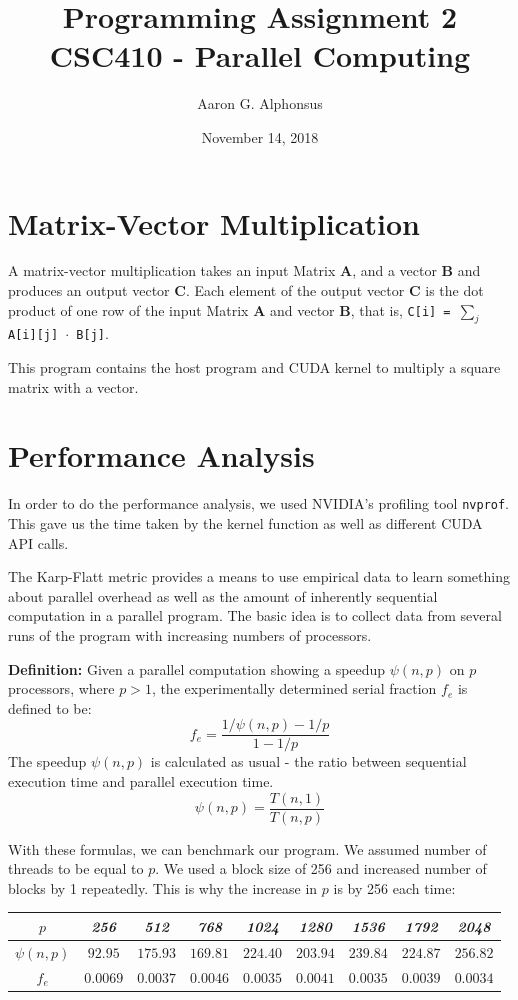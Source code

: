\documentclass{article}
\title{Programming Assignment 2\\ CSC410 - Parallel Computing}
\author{Aaron G. Alphonsus}
\date{November 14, 2018}
\begin{document}
\maketitle

\section{Matrix-Vector Multiplication}

A matrix-vector multiplication takes an input Matrix \textbf{A}, and a vector 
\textbf{B} and produces an output vector \textbf{C}. Each element of the output 
vector \textbf{C} is the dot product of one row of the input Matrix \textbf{A} 
and vector \textbf{B}, that is, \texttt{C[i] = $\sum_{j}$ A[i][j] $\cdot$ B[j]}.

\medskip
\noindent
This program contains the host program and CUDA kernel to multiply a square 
matrix with a vector.

\section{Performance Analysis}
In order to do the performance analysis, we used NVIDIA's profiling tool 
\texttt{nvprof}. This gave us the time taken by the kernel function as well as 
different CUDA API calls.

\medskip
\noindent
The Karp-Flatt metric provides a means to use empirical data to learn something 
about parallel overhead as well as the amount of inherently sequential 
computation in a parallel program. The basic idea is to collect data from 
several runs of the program with increasing numbers of processors.

\medskip
\noindent
\textbf{Definition:} Given a parallel computation showing a speedup $\psi(n, p)$
on $p$ processors, where $p > 1$, the experimentally determined serial fraction 
$f_e$ is defined to be: 
\[f_e = \frac{1/\psi(n, p) - 1/p}{1 - 1/p}\]
The speedup $\psi(n, p)$ is calculated as usual - the ratio between sequential 
execution time and parallel execution time.
\[\psi(n, p) = \frac{T(n, 1)}{T(n, p)}\]

\medskip
\noindent
With these formulas, we can benchmark our program. We assumed number of threads 
to be equal to $p$. We used a block size of 256 and increased number of blocks 
by 1 repeatedly. This is why the increase in $p$ is by 256 each time:
\begin{table}[ht]
\centering
\begin{tabular}{|c|c|c|c|c|c|c|c|c|}
\hline
$p$ & \textit{256}  & \textit{512}  & \textit{768}  & \textit{1024} 
    & \textit{1280} & \textit{1536} & \textit{1792} & \textit{2048} \\ \hline
$\psi(n, p)$ & $92.95$  & $175.93$ & $169.81$ & $224.40$ & $203.94$ & $239.84$ 
             & $224.87$ & $256.82$ \\ \hline
$f_e$ & $0.0069$  & $0.0037$ & $ 0.0046$ & $ 0.0035$ & $ 0.0041$ & $ 0.0035$ 
      & $ 0.0039$ & $ 0.0034$ \\ \hline
\end{tabular}
\end{table}
\end{document}
